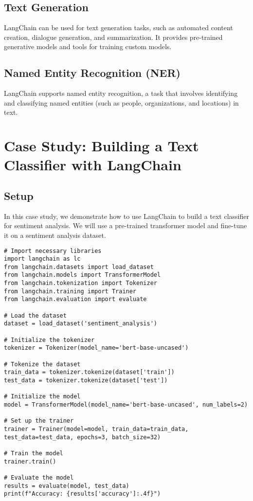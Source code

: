 \subsection{Text Generation}
LangChain can be used for text generation tasks, such as automated content creation, dialogue generation, and summarization. It provides pre-trained generative models and tools for training custom models.

\subsection{Named Entity Recognition (NER)}
LangChain supports named entity recognition, a task that involves identifying and classifying named entities (such as people, organizations, and locations) in text.

\section{Case Study: Building a Text Classifier with LangChain}

\subsection{Setup}
In this case study, we demonstrate how to use LangChain to build a text classifier for sentiment analysis. We will use a pre-trained transformer model and fine-tune it on a sentiment analysis dataset.

\begin{verbatim}
# Import necessary libraries
import langchain as lc
from langchain.datasets import load_dataset
from langchain.models import TransformerModel
from langchain.tokenization import Tokenizer
from langchain.training import Trainer
from langchain.evaluation import evaluate

# Load the dataset
dataset = load_dataset('sentiment_analysis')

# Initialize the tokenizer
tokenizer = Tokenizer(model_name='bert-base-uncased')

# Tokenize the dataset
train_data = tokenizer.tokenize(dataset['train'])
test_data = tokenizer.tokenize(dataset['test'])

# Initialize the model
model = TransformerModel(model_name='bert-base-uncased', num_labels=2)

# Set up the trainer
trainer = Trainer(model=model, train_data=train_data, test_data=test_data, epochs=3, batch_size=32)

# Train the model
trainer.train()

# Evaluate the model
results = evaluate(model, test_data)
print(f"Accuracy: {results['accuracy']:.4f}")
\end{verbatim}

